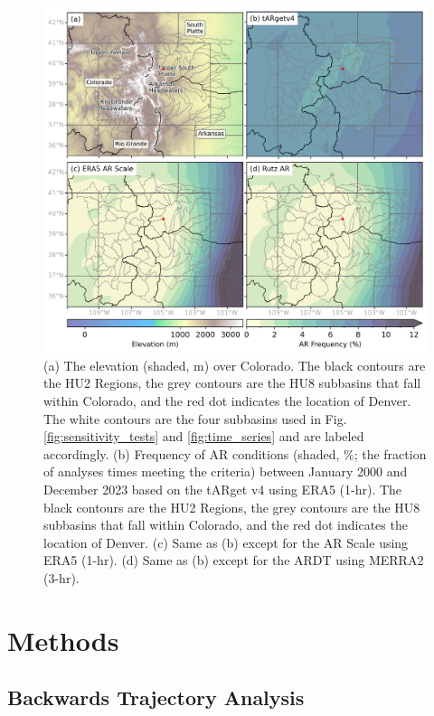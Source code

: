 \documentclass[draft]{agujournal2019}
\begin{document}
\begin{figure}
\noindent\includegraphics[width=\textwidth, height=\textheight, keepaspectratio]{fig1.png}
\caption{(a) The elevation (shaded, m) over Colorado. The black contours are the HU2 Regions, the grey contours are the HU8 subbasins that fall within Colorado, and the red dot indicates the location of Denver. The white contours are the four subbasins used in Fig. \ref{fig:sensitivity_tests} and \ref{fig:time_series} and are labeled accordingly. (b) Frequency of AR conditions (shaded, \%; the fraction of analyses times meeting the criteria) between January 2000 and December 2023 based on the  tARget v4 using ERA5 (1-hr). The black contours are the HU2 Regions, the grey contours are the HU8 subbasins that fall within Colorado, and the red dot indicates the location of Denver. (c) Same as (b) except for the AR Scale \cite{MartinRalph2019} using ERA5 (1-hr). (d) Same as (b) except for the  ARDT using MERRA2 (3-hr). }
\label{fig:ar_overhead}
\end{figure}

\section{Methods}
\label{sec:methods}
\subsection{Backwards Trajectory Analysis}
\end{document}
